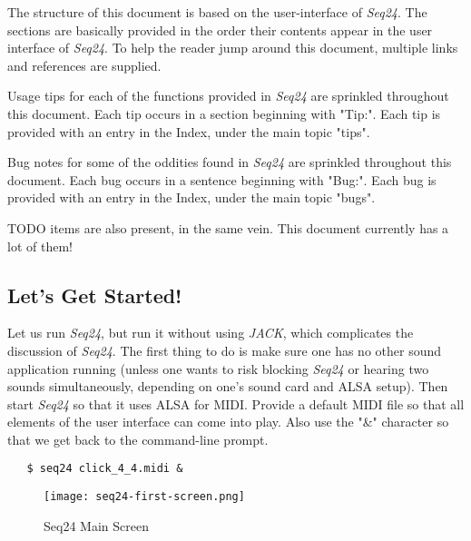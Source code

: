 \documentclass[
 11pt,
 twoside,
 a4paper,
 headinclude,
 footinclude,
 final                                 %
]{article}
\begin{document}
   The structure of this document is based on the user-interface of
   \textsl{Seq24}.
   The sections are basically provided
   in the order their contents appear in the user interface of
   \textsl{Seq24}.  To help the reader jump around this document, multiple
   links and references are supplied.

   Usage tips
   for each of the functions provided in
   \textsl{Seq24} are sprinkled throughout this document.
   Each tip occurs in a section beginning with "Tip:".
   Each tip is provided with an entry in the Index, under the
   main topic "tips".

   Bug notes
   for some of the oddities found in \textsl{Seq24} are
   sprinkled throughout this document.
   Each bug occurs in a sentence beginning with "Bug:".
   Each bug is provided with an entry in the Index, under the
   main topic "bugs".

   TODO items
   are also present, in the same vein.
   This document currently has a lot of them!

\subsection{Let's Get Started!}
\label{subsec:introduction_lets_get_started}

   Let us run \textsl{Seq24}, but run it without using \textsl{JACK}, which
   complicates the discussion of \textsl{Seq24}.  The first
   thing to do is make sure one has no other sound application running
   (unless one wants to risk blocking \textsl{Seq24} or hearing two sounds
   simultaneously, depending on one's sound card and ALSA setup).
   Then start \textsl{Seq24} so that it uses ALSA for
   MIDI.  Provide a default MIDI file so that all elements of the user
   interface can come into play.
   Also use the "\&" character so that we get back to the
   command-line prompt.

\begin{verbatim}
   $ seq24 click_4_4.midi &
\end{verbatim}

\begin{figure}[H]
   \centering 
   \texttt{[image: seq24-first-screen.png]}
   \caption{Seq24 Main Screen}
   \label{fig:seq24_main_screen}
\end{figure}

   
\end{document}
